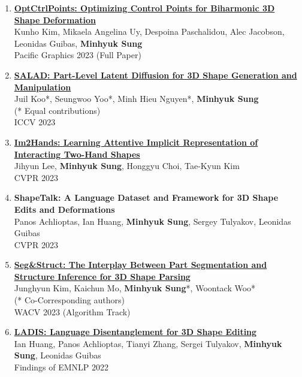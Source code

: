 \documentclass[letterpaper,10pt]{article} %
\newcommand{\blankline}{\quad\pagebreak[2]}
\begin{document}
{{\begin{enumerate}
\item \label{pg23}
\href{https://arxiv.org/abs/2309.12899}{\textbf{OptCtrlPoints: Optimizing Control Points for Biharmonic 3D Shape Deformation}}\\
Kunho Kim, Mikaela Angelina Uy, Despoina Paschalidou, Alec Jacobson, Leonidas Guibas, \textbf{Minhyuk Sung}\\
Pacific Graphics 2023 (Full Paper)\\
\blankline

\item \label{iccv23}
\href{https://arxiv.org/abs/2303.12236}{\textbf{SALAD: Part-Level Latent Diffusion for 3D Shape Generation and Manipulation}}\\
Juil Koo*, Seungwoo Yoo*, Minh Hieu Nguyen*, \textbf{Minhyuk Sung}\\
(* Equal contributions)\\
ICCV 2023\\
\blankline

\item \label{cvpr23_2}
\href{https://arxiv.org/abs/2302.14348}{\textbf{Im2Hands: Learning Attentive Implicit Representation of Interacting Two-Hand Shapes}}\\
Jihyun Lee, \textbf{Minhyuk Sung}, Honggyu Choi, Tae-Kyun Kim\\
CVPR 2023\\
\blankline

\item \label{cvpr23_1}
\textbf{ShapeTalk: A Language Dataset and Framework for 3D Shape Edits and Deformations}\\
Panos Achlioptas, Ian Huang, \textbf{Minhyuk Sung}, Sergey Tulyakov, Leonidas Guibas\\
CVPR 2023\\
\blankline

\item \label{wacv23}
\href{https://arxiv.org/abs/2212.05011}{\textbf{Seg\&Struct: The Interplay Between Part Segmentation and Structure Inference for 3D Shape Parsing}}\\
Junghyun Kim, Kaichun Mo, \textbf{Minhyuk Sung}*, Woontack Woo*\\
(* Co-Corresponding authors)\\
WACV 2023 (Algorithm Track)\\
\blankline

\item \label{emnlp22}
\href{https://arxiv.org/abs/2212.05011}{\textbf{LADIS: Language Disentanglement for 3D Shape Editing}}\\
Ian Huang, Panos Achlioptas, Tianyi Zhang, Sergei Tulyakov, \textbf{Minhyuk Sung}, Leonidas Guibas \\
Findings of EMNLP 2022\\
\blankline


\end{enumerate}}}
\end{document}
